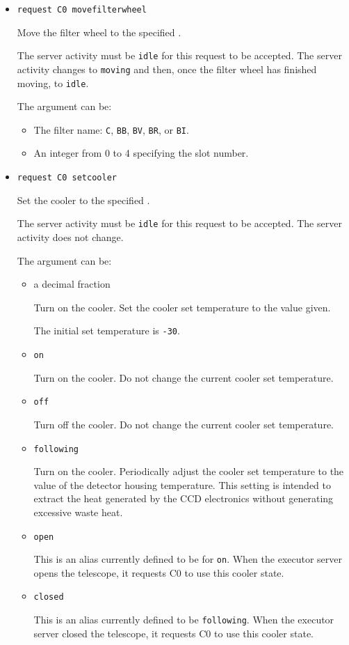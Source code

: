 \begin{itemize}
\item
\verb|request C0 movefilterwheel| 

Move the filter wheel to the specified . 

The server activity must be \verb|idle| for this request to be accepted. The server activity changes to \verb|moving| and then, once the filter wheel has finished moving, to \verb|idle|.

The  argument can be:

\begin{itemize}
\item
The filter name: \verb|C|, \verb|BB|, \verb|BV|, \verb|BR|, or \verb|BI|.
\item
An integer from 0 to 4 specifying the slot number.
\end{itemize}

\item
\verb|request C0 setcooler| 

Set the cooler to the specified . 

The server activity must be \verb|idle| for this request to be accepted. The server activity does not change.

The  argument can be:

\begin{itemize}
\item
a decimal fraction

Turn on the cooler. Set the cooler set temperature to the value given.

The initial set temperature is \verb|-30|.
\item
\verb|on|

Turn on the cooler. Do not change the current cooler set temperature.

\item
\verb|off|

Turn off the cooler. Do not change the current cooler set temperature.

\item
\verb|following|

Turn on the cooler. Periodically adjust the cooler set temperature to the value of the detector housing temperature. This setting is intended to extract the heat generated by the CCD electronics without generating excessive waste heat.

\item
\verb|open|

This is an alias currently defined to be for \verb|on|. When the executor server opens the telescope, it requests C0 to use this cooler state.

\item
\verb|closed|

This is an alias currently defined to be \verb|following|. When the executor server closed the telescope, it requests C0 to use this cooler state.

\end{itemize}

\end{itemize}

